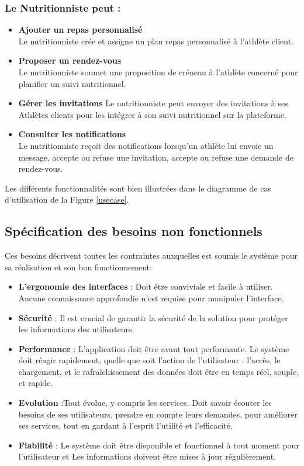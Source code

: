 \documentclass[a4paper,12pt]{report}
\begin{document}
\subsubsection*{Le Nutritionniste peut :}
\begin{itemize}
   
    \item \textbf{Ajouter un repas personnalisé} \\
    Le nutritionniste crée et assigne un plan 
    repas personnalisé à l'athlète client.
    \item \textbf{Proposer un rendez-vous} \\
    Le nutritionniste soumet une proposition de créneau 
    à l'athlète concerné pour planifier un suivi nutritionnel.
    \item \textbf{Gérer les invitations} 
    Le nutritionniste peut envoyer des invitations à ses 
    Athlètes clients pour les intégrer à son suivi nutritionnel sur la plateforme.
    \item \textbf{Consulter les notifications} \\
    Le nutritionniste reçoit des notifications lorsqu'un athlète lui envoie un message, accepte ou refuse une invitation, accepte ou refuse une demande de rendez-vous.
\end{itemize}

Les différents fonctionnalités sont bien illustrées dans le diagramme de cas d'utilisation de la Figure \ref{usecase}.
\subsection{Spécification des besoins non fonctionnels}
Ces besoins décrivent toutes les contraintes auxquelles est soumis le système pour sa réalisation et son bon fonctionnement:

\begin{itemize}
    \item \textbf{L'ergonomie des interfaces} : Doit être conviviale et facile à utiliser. 
    Aucune connaissance approfondie n'est requise pour manipuler l'interface.
    \item \textbf{Sécurité }: Il est crucial de garantir la sécurité de la solution pour protéger les informations des utilisateurs.
   \item \textbf{Performance } : L'application doit être avant tout performante. Le système doit réagir rapidement, 
    quelle que soit l'action de l'utilisateur : l'accès, le chargement, et le rafraîchissement des données doit être en temps réel, souple, et rapide. 
   
    \item \textbf{Evolution } :Tout évolue, y compris les services. Doit savoir écouter les besoins de ses utilisateurs, prendre en compte leurs demandes,
     pour améliorer ses services, tout en gardant à l'esprit l'utilité et l'efficacité.
     \item \textbf{Fiabilité} : Le système doit être disponible et fonctionnel à tout moment pour l'utilisateur et Les informations doivent être mises à jour régulièrement.
\end{itemize}
\end{document}

